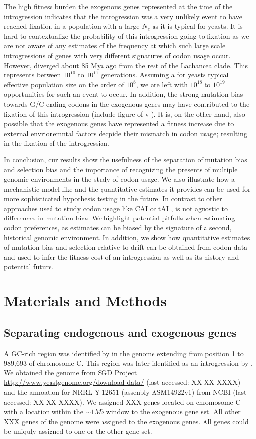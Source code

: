 \documentclass[12pt]{article}
\begin{document}
The high fitness burden the exogenous genes represented at the time of the introgression indicates that the introgression was a very unlikely event to have reached fixation in a population with a large $N_e$ as it is typical for yeasts.
It is hard to contextualize the probability of this introgression going to fixation as we are not aware of any estimates of the frequency at which such large scale introgressions of genes with very different signatures of codon usage occur.
However, \kluyveri diverged about 85 Mya ago from the rest of the Lachancea clade.
This represents between $10^{10}$ to $10^{11}$ generations.
Assuming a for yeasts typical effective population size on the order of $10^8$, we are left with $10^{18}$ to $10^{19}$ opportunities for such an event to occur.
In addition, the strong mutation bias towards G/C ending codons in the exogenous genes may have contributed to the fixation of this introgression (include figure of \DM v \DE).
It is, on the other hand, also possible that the exogenous genes have represented a fitness increase due to external envrionemntal factors decpide their mismatch in codon usage; resulting in the fixation of the introgression.
 
In conclusion, our results show the usefulness of the separation of mutation bias and selection bias and the importance of recognizing the presents of multiple genomic environments in the study of codon usage.
We also illustrate how a mechanistic model like \ROC and the quantitative estimates it provides can be used for more sophisticated hypothesis testing in the future.
In contrast to other approaches used to study codon usage like CAI \citep{sharp1987} or tAI \citep{dosreis2004}, \ROC is not agnostic to differences in mutation bias.
We highlight potential pitfalls when estimating codon preferences, as estimates can be biased by the signature of a second, historical genomic environment.
In addition, we show how quantitative estimates of mutation bias and selection relative to drift can be obtained from codon data and used to infer the fitness cost of an introgression as well as its history and potential future.


\section*{Materials and Methods}

\subsection*{Separating endogenous and exogenous genes}
A GC-rich region was identified by \citet{payen2009} in the \kluyveri genome extending from position 1 to 989,693 of chromosome C.
This region was later identified as an introgression by \citet{friedrich2015}.
We obtained the \kluyveri genome from SGD Project \url{http://www.yeastgenome.org/download-data/} (last accessed: XX-XX-XXXX) and the annoation for \kluyveri NRRL Y-12651 (assenbly ASM14922v1) from NCBI (last accessed: XX-XX-XXXX).
We assigned XXX genes located on chromosome C with a location within the $\sim 1 Mb$ window to the exogenous gene set.
All other XXX genes of the \kluyveri genome were assigned to the exogenous genes.
All genes could be uniquly assigned to one or the other gene set.
\end{document}

